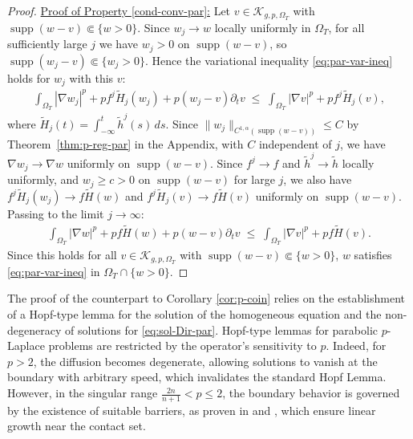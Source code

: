 \documentclass[11pt,oneside,english]{amsart}
\newcommand{\cK}{{\mathcal K}}
\newcommand{\al}{\alpha}
\newcommand{\supp}{\operatorname{supp}}
\numberwithin{equation}{section}
\theoremstyle{plain}
\numberwithin{equation}{section}
\begin{document}
\begin{proof}
\noindent 
\underline{Proof of Property \ref{cond-conv-par}:}
Let $v\in\cK_{g,p,\Omega_T}$ with $\supp(w-v)\Subset\{w>0\}$.
Since $w_j\to w$ locally uniformly in $\Omega_T$, for all
sufficiently large $j$ we have $w_j>0$ on $\supp(w-v)$, so
$\supp(w_j-v)\Subset\{w_j>0\}$. Hence the variational
inequality \eqref{eq:par-var-ineq} holds for $w_j$ with
this $v$:
\begin{align*}
  \int_{\Omega_T}|\nabla w_j|^p+pf^j\tilde H_j(w_j)
  +p(w_j-v)\partial_tv
  \;\leq\;
  \int_{\Omega_T}|\nabla v|^p+pf^j\tilde H_j(v),
\end{align*}
where $\tilde H_j(t)=\int_{-\infty}^t\tilde h^j(s)\,ds$.
Since $\|w_j\|_{C^{1,\al}(\supp(w-v))}\le C$ by
Theorem~\ref{thm:p-reg-par} in the Appendix, with $C$ independent of $j$,
we have $\nabla w_j\to\nabla w$ uniformly on $\supp(w-v)$.
Since $f^j\to f$ and $\tilde h^j\to\tilde h$ locally
uniformly, and $w_j\ge c>0$ on $\supp(w-v)$ for large $j$,
we also have $f^j\tilde H_j(w_j)\to f\tilde H(w)$ and
$f^j\tilde H_j(v)\to f\tilde H(v)$ uniformly on $\supp(w-v)$.
Passing to the limit $j\to\infty$:
\begin{align*}
  \int_{\Omega_T}|\nabla w|^p+pf\tilde H(w)+p(w-v)\partial_tv
  \;\leq\;
  \int_{\Omega_T}|\nabla v|^p+pf\tilde H(v).
\end{align*}
Since this holds for all $v\in\cK_{g,p,\Omega_T}$ with
$\supp(w-v)\Subset\{w>0\}$, $w$ satisfies
\eqref{eq:par-var-ineq} in $\Omega_T\cap\{w>0\}$.
\end{proof}







The proof of the counterpart to Corollary \ref{cor:p-coin} relies on the establishment of a Hopf-type lemma for the solution of the homogeneous equation and the non-degeneracy of solutions for \eqref{eq:sol-Dir-par}.  
Hopf-type lemmas for parabolic $p$-Laplace problems are restricted by the operator's sensitivity to $p$. Indeed, for $p > 2$, the diffusion becomes degenerate, allowing solutions to vanish at the boundary with arbitrary speed, which invalidates the standard Hopf Lemma. However, in the singular range $\frac{2n}{n+1} < p \leq 2$, the boundary behavior is governed by the existence of suitable barriers, as proven in \cite{AvelinGianazzaSalsa2016} and \cite{KuusiMingioneNystrom2014}, which ensure linear growth near the contact set. 
\end{document}
